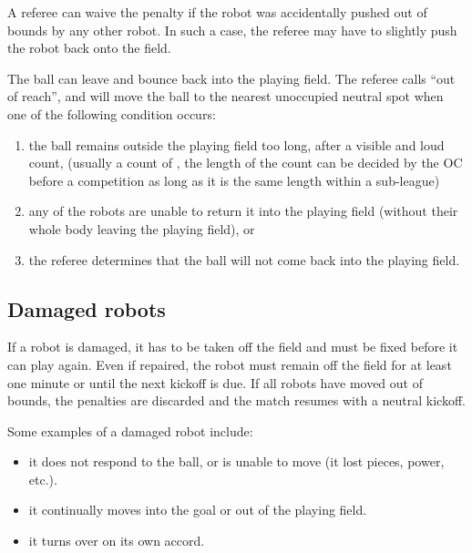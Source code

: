 \documentclass{article}
\begin{document}
A referee can waive the penalty if the robot was accidentally pushed out of
bounds by any other robot. In such a case, the
referee may have to slightly push the robot back onto the field.

The ball can leave and bounce back into the playing field. The referee calls
``out of reach'', and will move the ball to the nearest unoccupied neutral spot
when one of the following condition occurs:

\begin{enumerate}
    \item the ball remains outside the playing field too long,
        after a visible and loud count, (usually a count of
        , the length of
        the count can be decided by the OC before a competition as long as it
        is the same length within a sub-league)

    \item any of the robots are unable to return it into the playing field
        (without their whole body leaving the playing field), or

    \item the referee determines that the ball will not come back into the
        playing field.

\end{enumerate}

\subsection{Damaged robots \label{ref-012}}

If a robot is damaged, it has to be taken off the field and must be fixed
before it can play again. Even if repaired, the robot must remain off the field
for at least one minute or until the next kickoff is due. If all robots have
moved out of bounds, the penalties are discarded and the match resumes with a
neutral kickoff.

Some examples of a damaged robot include:

\begin{itemize}

\item it does not respond to the ball, or is unable to move (it lost pieces,
    power, etc.).

\item it continually moves into the goal or out of the playing field.

\item it turns over on its own accord.

\end{itemize}
\end{document}
